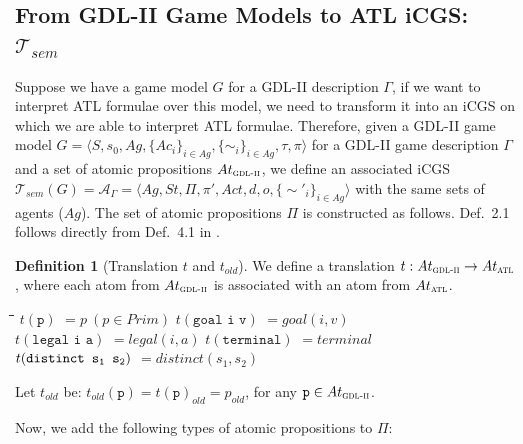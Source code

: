\documentclass{article}
\theoremstyle{theorem}
\theoremstyle{lemma}
\theoremstyle{definition}
\newtheorem{definition}{Definition}[section]
\theoremstyle{remark}
\begin{document}
\subsection{From GDL-II Game Models to ATL iCGS: $\mathcal{T}_\textit{sem}$}
\par Suppose we have a game model $G$ for a GDL-II description $\Gamma$, if we want to interpret ATL formulae over this model, we need to transform it into an iCGS on which we are able to interpret ATL formulae. Therefore, given a GDL-II game model $G=\langle S, s_{0}, Ag, \{Ac_{i}\}_{i \in Ag}, \{ \sim_i \}_{i \in Ag}, \tau, \pi \rangle$ for a GDL-II game description $\Gamma$ and a set of atomic propositions $At_\textsc{gdl-ii}$, we define an associated iCGS $\mathcal{T}_\textit{sem}(G) = \mathcal{A}_\Gamma = \langle{Ag, St, \Pi, \pi', Act, d, o, \{\sim'_{i}\}_{i \in Ag}} \rangle$ with the same sets of agents ($Ag$). The set of atomic propositions $\Pi$ is constructed as follows. Def.~2.1 follows directly from Def.~4.1 in \citep{GDLpaper}.
\begin{definition}[Translation $t$ and $t_{old}$]
    We define a translation $t: At_\textsc{gdl-ii} \rightarrow At_\textsc{atl}$, where each atom from $At_\textsc{gdl-ii}$ is associated with an atom from $At_\textsc{atl}$.
    \begin{tabbing}
    \hspace{2cm} \= \hspace{3cm}\= \hspace{3.2cm}\= \hspace{2cm}\= \kill
    \> $t(\texttt{p})$ \> $= p \: (p \in Prim)$ \> $t(\texttt{goal i v})$ \> $=goal(i,v)$ \\
    \> $t(\texttt{legal i a})$ \> $=legal(i,a)$ \> $t(\texttt{terminal})$ \> $=terminal$ \\
    \> $t(\texttt{distinct s\textsubscript{1} s\textsubscript{2}})$ \> $=distinct(s_1,s_2)$
    \end{tabbing}
    Let $t_{old}$ be: $t_{old}(\texttt{p})=t(\texttt{p})_{old} = p_{old}$, for any $\texttt{p} \in At_\textsc{gdl-ii}$.
\end{definition}
\par Now, we add the following types of atomic propositions to $\Pi$:
\end{document}
